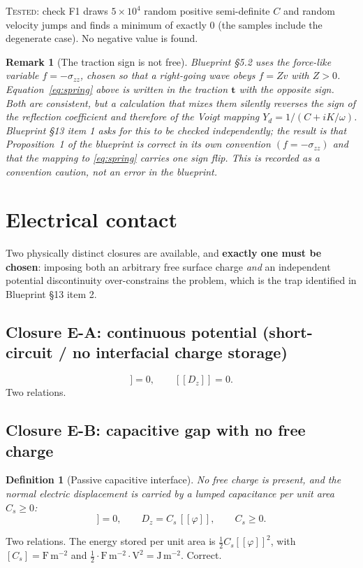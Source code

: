 \documentclass[11pt]{article}
\newcommand{\s}{\sigma}
\newcommand{\bt}{\bm{t}}
\newcommand{\jmp}[1]{[\![#1]\!]}
\theoremstyle{plain}
\newtheorem{remark}{Remark}
\newtheorem{definition}{Definition}
\begin{document}
\textsc{Tested}: check F1 draws $5\times10^{4}$ random positive semi-definite
$C$ and random velocity jumps and finds a minimum of exactly $0$ (the samples
include the degenerate case). No negative value is found.

\begin{remark}[The traction sign is not free]
\label{rem:traction-sign}
Blueprint \S5.2 uses the force-like variable $f=-\s_{zz}$, chosen so that a
right-going wave obeys $f=Zv$ with $Z>0$. Equation~\eqref{eq:spring} above is
written in the traction $\bt$ with the \emph{opposite} sign. Both are consistent,
but a calculation that mixes them silently reverses the sign of the reflection
coefficient and therefore of the Voigt mapping $Y_d = 1/(C+iK/\omega)$. Blueprint
\S13 item 1 asks for this to be checked independently; the result is that
Proposition~1 of the blueprint is correct \emph{in its own convention} $(f=-\s_{zz})$
and that the mapping to \eqref{eq:spring} carries one sign flip. This is recorded
as a convention caution, not an error in the blueprint.
\end{remark}

\section{Electrical contact}
\label{sec:elec}

Two physically distinct closures are available, and \textbf{exactly one must be
chosen}: imposing both an arbitrary free surface charge \emph{and} an independent
potential discontinuity over-constrains the problem, which is the trap identified
in Blueprint \S13 item 2.

\subsection{Closure E-A: continuous potential (short-circuit / no interfacial charge storage)}
\begin{equation}
  \jmp{\varphi} = 0, \qquad \jmp{D_z} = 0 .
  \label{eq:elec-EA}
\end{equation}
Two relations.

\subsection{Closure E-B: capacitive gap with no free charge}
\begin{definition}[Passive capacitive interface]
\label{def:cap}
No free charge is present, and the normal electric displacement is carried by a
lumped capacitance per unit area $C_s\ge0$:
\begin{equation}
  \jmp{D_z} = 0, \qquad D_z = C_s\,\jmp{\varphi}, \qquad C_s \ge 0 .
  \label{eq:elec-EB}
\end{equation}
\end{definition}
Two relations. The energy stored per unit area is
$\tfrac12 C_s \jmp{\varphi}^2$, with $[C_s]=\mathrm{F\,m^{-2}}$ and
$\tfrac12\cdot\mathrm{F\,m^{-2}}\cdot\mathrm{V^2}
= \mathrm{J\,m^{-2}}$. Correct.
\end{document}
